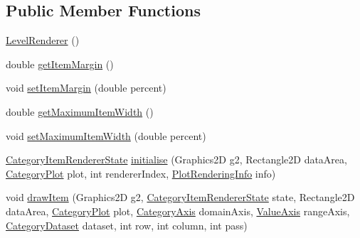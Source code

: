 \subsection*{Public Member Functions}
\begin{DoxyCompactItemize}
\item 
\mbox{\hyperlink{classorg_1_1jfree_1_1chart_1_1renderer_1_1category_1_1_level_renderer_a47ea7cfe9ad17b8e9c94f7e71582e64a}{Level\+Renderer}} ()
\item 
double \mbox{\hyperlink{classorg_1_1jfree_1_1chart_1_1renderer_1_1category_1_1_level_renderer_aa3b02fa6e0fc56b868993773e8db90db}{get\+Item\+Margin}} ()
\item 
void \mbox{\hyperlink{classorg_1_1jfree_1_1chart_1_1renderer_1_1category_1_1_level_renderer_a66826c3492cb7e8c1b1fe197b6771fc0}{set\+Item\+Margin}} (double percent)
\item 
double \mbox{\hyperlink{classorg_1_1jfree_1_1chart_1_1renderer_1_1category_1_1_level_renderer_a88db8968a9830ef1873f9696b6b145e5}{get\+Maximum\+Item\+Width}} ()
\item 
void \mbox{\hyperlink{classorg_1_1jfree_1_1chart_1_1renderer_1_1category_1_1_level_renderer_ab661cdb9984c132949d5229d1f581bb4}{set\+Maximum\+Item\+Width}} (double percent)
\item 
\mbox{\hyperlink{classorg_1_1jfree_1_1chart_1_1renderer_1_1category_1_1_category_item_renderer_state}{Category\+Item\+Renderer\+State}} \mbox{\hyperlink{classorg_1_1jfree_1_1chart_1_1renderer_1_1category_1_1_level_renderer_abed5cde7c6ab65c2576e9b1479178ef5}{initialise}} (Graphics2D g2, Rectangle2D data\+Area, \mbox{\hyperlink{classorg_1_1jfree_1_1chart_1_1plot_1_1_category_plot}{Category\+Plot}} plot, int renderer\+Index, \mbox{\hyperlink{classorg_1_1jfree_1_1chart_1_1plot_1_1_plot_rendering_info}{Plot\+Rendering\+Info}} info)
\item 
void \mbox{\hyperlink{classorg_1_1jfree_1_1chart_1_1renderer_1_1category_1_1_level_renderer_a23bc2694ab4115db745562e612fbf8b4}{draw\+Item}} (Graphics2D g2, \mbox{\hyperlink{classorg_1_1jfree_1_1chart_1_1renderer_1_1category_1_1_category_item_renderer_state}{Category\+Item\+Renderer\+State}} state, Rectangle2D data\+Area, \mbox{\hyperlink{classorg_1_1jfree_1_1chart_1_1plot_1_1_category_plot}{Category\+Plot}} plot, \mbox{\hyperlink{classorg_1_1jfree_1_1chart_1_1axis_1_1_category_axis}{Category\+Axis}} domain\+Axis, \mbox{\hyperlink{classorg_1_1jfree_1_1chart_1_1axis_1_1_value_axis}{Value\+Axis}} range\+Axis, \mbox{\hyperlink{interfaceorg_1_1jfree_1_1data_1_1category_1_1_category_dataset}{Category\+Dataset}} dataset, int row, int column, int pass)

\end{DoxyCompactItemize}

